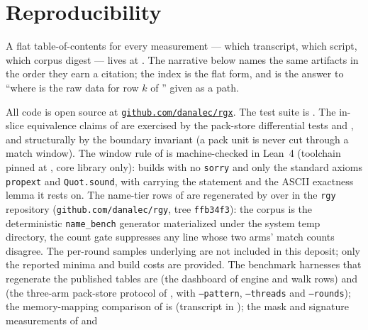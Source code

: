 \documentclass[11pt,letterpaper]{article}
\begin{document}
\section*{Reproducibility}
A flat table-of-contents for every measurement --- which transcript, which
script, which corpus digest --- lives at . The
narrative below names the same artifacts in the order they earn a citation;
the index is the flat form, and is the answer to ``where is the raw data
for row $k$ of '' given as a path.

All code is open source at
\href{https://github.com/danalec/rgx}{\texttt{github.com/danalec/rgx}}. The test suite is
. The in-slice equivalence
claims of  are exercised by the pack-store
differential tests 
and ,
and structurally by the boundary invariant
 (a pack unit is never cut
through a match window). The window rule of  is
machine-checked in Lean~4 (toolchain pinned at
, core library only):  builds with
no \texttt{sorry} and only the standard axioms \texttt{propext} and
\texttt{Quot.sound}, with  carrying
the statement and  the ASCII exactness
lemma it rests on. The name-tier rows of  are
regenerated by  over
 in the \texttt{rgy}
repository (\texttt{github.com/danalec/rgy}, tree
\texttt{ffb34f3}): the corpus is the deterministic \texttt{name\_bench}
generator materialized under the system temp directory, the count gate
suppresses any line whose two arms' match counts disagree. The per-round
samples underlying  are not included in this deposit; only the
reported minima and build costs are provided.
The benchmark harnesses that regenerate the
published tables are  (the dashboard of
engine and walk rows) and  (the three-arm
pack-store protocol of , with
\texttt{--pattern}, \texttt{--threads} and \texttt{--rounds}); the
memory-mapping comparison of  is 
(transcript in );
the mask and signature measurements of  and 
\end{document}
